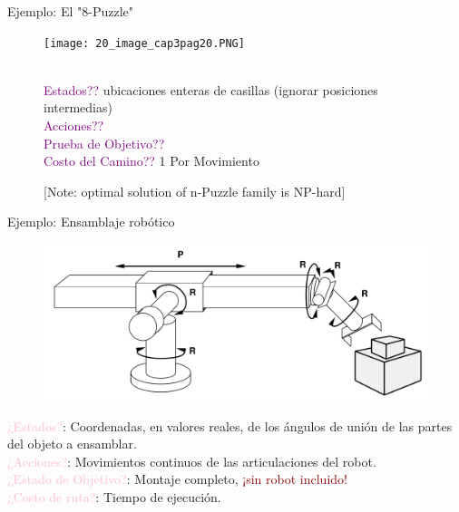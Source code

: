 \documentclass{beamer}
\theoremstyle{definition}
\theoremstyle{theorem}
\theoremstyle{remark}
\begin{document}
\begin{frame}{Ejemplo: El "8-Puzzle"}
\begin{figure}
    \centering
    \texttt{[image: 20\_image\_cap3pag20.PNG]}
    \begin{flushleft}
        \\ \textcolor{purple}{Estados??} ubicaciones enteras de casillas (ignorar posiciones intermedias)
        \\\textcolor{purple}{Acciones??}
        \\\textcolor{purple}{Prueba de Objetivo??}
        \\\textcolor{purple}{Costo del Camino??} 1 Por Movimiento
        
        [Note: optimal solution of n-Puzzle family is NP-hard]
    \end{flushleft}
\end{figure}{}
    
\end{frame}


\begin{frame}{Ejemplo: Ensamblaje robótico}
\begin{figure}
    \centering
    \includegraphics[scale=0.23]{24_chap3_pag24.png}
\end{figure}
\begin{flushleft}
    \textcolor{Pink}{¿Estados?}: Coordenadas, en valores reales, de los ángulos de unión de las partes del objeto a ensamblar.\\
    \textcolor{Pink}{¿Acciones?}: Movimientos continuos de las articulaciones del
    robot.\\
    \textcolor{Pink}{¿Estado de Objetivo?}: Montaje completo,
    \textcolor{DarkRed}{¡sin robot incluido!}\\
    \textcolor{Pink}{¿Costo de ruta?}: Tiempo de ejecución.
\end{flushleft}
\end{frame}
\end{document}
